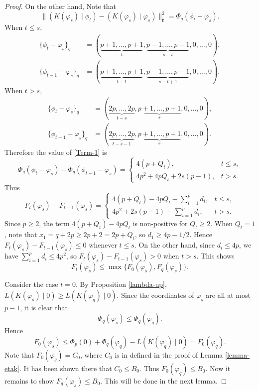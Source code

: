 \documentclass[11pt]{amsart}
\theoremstyle{plain}
\theoremstyle{definition}
\newcommand{\frk}{\mathfrak{k}}
\begin{document}
\begin{proof}
	On the other hand, Note that
	\[\|(K(\varphi_s)\mid\phi_t) - (K(\varphi_s)\mid\varphi_s)\|_{\frk}^2=\Phi_q(\phi_t-\varphi_s).\]
	When $t\le s$,
	\begin{align*}
		\{\phi_t-\varphi_s\}_q&=(\underbrace{p+1,\dots,p+1}_{t},\underbrace{p-1,\dots,p-1}_{s-t},0,\dots,0),\\
		\{\phi_{t-1}-\varphi_s\}_q&=(\underbrace{p+1,\dots,p+1}_{t-1},\underbrace{p-1,\dots,p-1}_{s-t+1},0,\dots,0).
	\end{align*}
	When $t>s$,
	\begin{align*}
		\{\phi_t-\varphi_s\}_q&=(\underbrace{2p,\dots,2p}_{t-s},\underbrace{p+1,\dots,p+1}_{s},0,\dots,0),\\
		\{\phi_{t-1}-\varphi_s\}_q&=(\underbrace{2p,\dots,2p}_{t-s-1},\underbrace{p+1,\dots,p+1}_{s},0,\dots,0).
	\end{align*}
	Therefore the value of \eqref{Term-1} is
	\[\Phi_q(\phi_t-\varphi_s)-\Phi_q(\phi_{t-1}-\varphi_s)=\left\{
	\begin{array}{ll}
		4(p+Q_t), & t\le s,\\
		4p^2+4pQ_t+2s(p-1), & t>s.
	\end{array}
	\right.\]
	Thus
	\[F_t(\varphi_s)-F_{t-1}(\varphi_{s})=\left\{
	\begin{array}{ll}
		4(p+Q_t)-4pQ_t-\sum_{i=1}^pd_i, & t\le s,\\
		4p^2+2s(p-1)-\sum_{i=1}^pd_i, & t>s.
	\end{array}
	\right.\]
	Since $p\ge 2$, the term $4(p+Q_t)-4pQ_t$ is non-positive for $Q_t\ge 2$. When $Q_t=1$, note that $x_1=q+2p\ge 2p+2=2p+Q_t$, so $d_1\ge 4p-1/2$. Hence $F_t(\varphi_s)-F_{t-1}(\varphi_{s})\le 0$ whenever $t\le s$. On the other hand, since $d_i\le 4p$, we have $\sum_{i=1}^pd_i\le 4p^2$, so $F_t(\varphi_s)-F_{t-1}(\varphi_{s})>0$ when $t>s$. This shows
	\[F_t(\varphi_s)\le \max\{F_0(\varphi_s), F_q(\varphi_{s})\}.\]
	
	Consider the case $t=0$. By Proposition \ref{lambda-up}, $L(K(\varphi_s)\mid 0)\ge L(K(\varphi_q)\mid 0)$. Since the coordinates of $\varphi_s$ are all at most $p-1$, it is clear that
	\[\Phi_q(\varphi_s)\le \Phi_q(\varphi_q).\]
	Hence
	\[F_0(\varphi_s) \le \Phi_p(0)+\Phi_q(\varphi_q)-L(K(\varphi_q)\mid 0)=F_0(\varphi_q).\]
Note that $F_0(\varphi_q)=C_0$,	where $C_0$ is in defined in the proof of Lemma \ref{lemma-etak}. It has been shown there that $C_0\leq B_0$. Thus $F_0(\varphi_q)\le B_0$. Now it remains to show $F_q(\varphi_s)\le B_0$. This will be done in the next lemma.
\end{proof}
\end{document}
